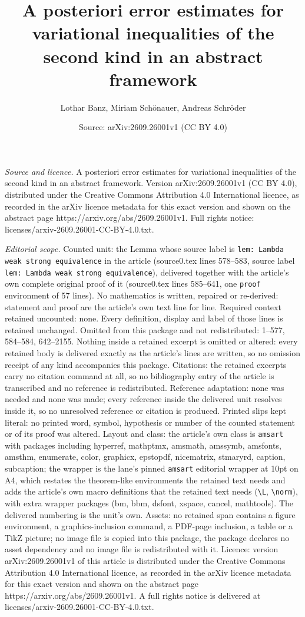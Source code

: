 \documentclass[10pt,a4paper]{amsart}
\title[A posteriori error estimates for variational inequalities of]{A posteriori error estimates for variational inequalities of the second kind in an abstract framework}
\author{Lothar Banz, Miriam Sch\"onauer, Andreas Schr\"oder}
\date{Source: arXiv:2609.26001v1 (CC BY 4.0)}
\begin{document}
\maketitle

\noindent\emph{Source and licence.} A posteriori error estimates for variational inequalities of the second kind in an abstract framework. Version arXiv:2609.26001v1 (CC BY 4.0), distributed under the Creative Commons Attribution 4.0 International licence, as recorded in the arXiv licence metadata for this exact version and shown on the abstract page https://arxiv.org/abs/2609.26001v1. Full rights notice: licenses/arxiv-2609.26001-CC-BY-4.0.txt.\par\smallskip

\noindent\textit{Editorial scope.} Counted unit: the Lemma whose source label is \texttt{lem: Lambda weak strong equivalence} in the article (source0.tex lines 578--583, source label \texttt{lem: Lambda weak strong equivalence}), delivered together with the article's own complete original proof of it (source0.tex lines 585--641, one \texttt{proof} environment of 57 lines). No mathematics is written, repaired or re-derived: statement and proof are the article's own text line for line. Required context retained uncounted: none. Every definition, display and label of those lines is retained unchanged. Omitted from this package and not redistributed: 1--577, 584--584, 642--2155. Nothing inside a retained excerpt is omitted or altered: every retained body is delivered exactly as the article's lines are written, so no omission receipt of any kind accompanies this package. Citations: the retained excerpts carry no citation command at all, so no bibliography entry of the article is transcribed and no reference is redistributed. Reference adaptation: none was needed and none was made; every reference inside the delivered unit resolves inside it, so no unresolved reference or citation is produced. Printed slips kept literal: no printed word, symbol, hypothesis or number of the counted statement or of its proof was altered. Layout and class: the article's own class is \texttt{amsart} with packages including hyperref, mathptmx, amsmath, amssymb, amsfonts, amsthm, enumerate, color, graphicx, epstopdf, nicematrix, stmaryrd, caption, subcaption; the wrapper is the lane's pinned \texttt{amsart} editorial wrapper at 10pt on A4, which restates the theorem-like environments the retained text needs and adds the article's own macro definitions that the retained text needs (\texttt{\textbackslash L}, \texttt{\textbackslash norm}), with extra wrapper packages (bm, bbm, dsfont, xspace, cancel, mathtools). The delivered numbering is the unit's own. Assets: no retained span contains a figure environment, a graphics-inclusion command, a PDF-page inclusion, a table or a TikZ picture; no image file is copied into this package, the package declares no asset dependency and no image file is redistributed with it. Licence: version arXiv:2609.26001v1 of this article is distributed under the Creative Commons Attribution 4.0 International licence, as recorded in the arXiv licence metadata for this exact version and shown on the abstract page https://arxiv.org/abs/2609.26001v1. A full rights notice is delivered at licenses/arxiv-2609.26001-CC-BY-4.0.txt. 
\end{document}
